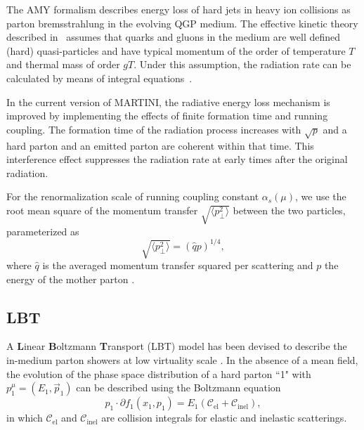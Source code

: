 \documentclass[aps,prc,twocolumn,floatfix,superscriptaddress,nofootinbib]{revtex4}
\begin{document}
The AMY formalism describes energy loss of hard jets in heavy ion collisions as parton bremsstrahlung in the evolving QGP medium. 
The effective kinetic theory described in~\cite{Arnold:2002zm} assumes that quarks and gluons in the medium are well defined (hard) quasi-particles and have typical momentum of the order of temperature $T$ and thermal mass of order $gT$.
Under this assumption, the radiation rate can be calculated by means of integral equations~\cite{Arnold:2002ja}.

In the current version of MARTINI, the radiative energy loss mechanism is improved by implementing the effects of finite formation time and running coupling.
The formation time of the radiation process increases with $\sqrt{p}$ and a hard parton and an emitted parton are coherent within that time.
This interference effect suppresses the radiation rate at early times after the original radiation.

For the renormalization scale of running coupling constant $\alpha_s(\mu)$, we use the root mean square of the momentum transfer $\sqrt{\langle p^2_\perp \rangle}$ between the two particles, parameterized as
\begin{equation}
	\sqrt{\langle p^2_\perp \rangle} = (\hat{q}p)^{1/4},
\end{equation}
where $\hat{q}$ is the averaged momentum transfer squared per scattering and $p$ the energy of the mother parton \cite{Young:2012dv}.


\subsection{LBT}
\label{subsec:LBT}

A {\bf L}inear {\bf B}oltzmann {\bf T}ransport (LBT) model has been devised to describe the in-medium parton showers at low virtuality scale \cite{Li:2010ts,Wang:2013cia,He:2015pra,Cao:2016gvr,Cao:2017hhk,Chen:2017zte}. In the absence of a mean field, the evolution of the phase space distribution of a hard parton ``1" with $p_1^\mu = (E_1, \vec{p}_1)$ can be described using the Boltzmann equation
\begin{equation}
  \label{eq:boltzmann1}
  p_1\cdot\partial f_1(x_1,p_1)=E_1 (\mathcal{C}_\mathrm{el}+\mathcal{C}_\mathrm{inel}),
\end{equation}
in which $\mathcal{C}_\mathrm{el}$ and $\mathcal{C}_\mathrm{inel}$ are collision integrals for elastic and inelastic scatterings.
\end{document}

